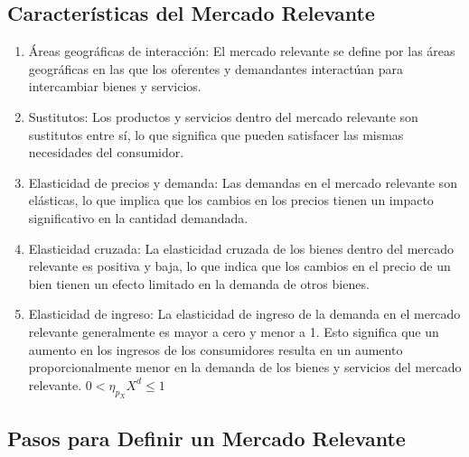 \documentclass[
  letterpaper,
  DIV=11,
  numbers=noendperiod]{scrartcl}
\begin{document}
\hypertarget{caracteruxedsticas-del-mercado-relevante}{%
\subsection{Características del Mercado
Relevante}\label{caracteruxedsticas-del-mercado-relevante}}

\begin{enumerate}
\def\labelenumi{\arabic{enumi}.}
\item
  Áreas geográficas de interacción: El mercado relevante se define por
  las áreas geográficas en las que los oferentes y demandantes
  interactúan para intercambiar bienes y servicios.
\item
  Sustitutos: Los productos y servicios dentro del mercado relevante son
  sustitutos entre sí, lo que significa que pueden satisfacer las mismas
  necesidades del consumidor.
\item
  Elasticidad de precios y demanda: Las demandas en el mercado relevante
  son elásticas, lo que implica que los cambios en los precios tienen un
  impacto significativo en la cantidad demandada.
\item
  Elasticidad cruzada: La elasticidad cruzada de los bienes dentro del
  mercado relevante es positiva y baja, lo que indica que los cambios en
  el precio de un bien tienen un efecto limitado en la demanda de otros
  bienes.
\item
  Elasticidad de ingreso: La elasticidad de ingreso de la demanda en el
  mercado relevante generalmente es mayor a cero y menor a 1. Esto
  significa que un aumento en los ingresos de los consumidores resulta
  en un aumento proporcionalmente menor en la demanda de los bienes y
  servicios del mercado relevante. \(0 < \eta_{p_{X}} X^d \leq 1\)
\end{enumerate}

\hypertarget{pasos-para-definir-un-mercado-relevante}{%
\subsection{Pasos para Definir un Mercado
Relevante}\label{pasos-para-definir-un-mercado-relevante}}
\end{document}
